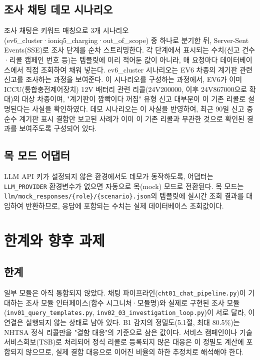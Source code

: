 \documentclass[11pt]{article}
\begin{document}
\subsection{조사 채팅 데모 시나리오}

조사 채팅은 키워드 매칭으로 3개 시나리오(ev6\_cluster·ioniq5\_charging·out\_of\_scope) 중 하나로 분기한 뒤, Server-Sent Events(SSE)로 조사 단계를 순차 스트리밍한다. 각 단계에서 표시되는 수치(신고 건수·리콜 캠페인 번호 등)는 템플릿에 미리 적어둔 값이 아니라, 매 요청마다 데이터베이스에서 직접 조회하여 채워 넣는다.
ev6\_cluster 시나리오는 EV6 차종의 계기판 관련 신고를 조사하는 과정을 보여준다. 이 시나리오를 구성하는 과정에서, EV6가 이미 ICCU(통합충전제어장치) 12V 배터리 관련 리콜(24V200000, 이후 24V867000으로 확대)의 대상 차종이며, "계기판이 깜빡이다 꺼짐" 유형 신고 대부분이 이 기존 리콜로 설명된다는 사실을 확인하였다. 데모 시나리오는 이 사실을 반영하여, 최근 90일 신고 중 순수 계기판 표시 결함만 보고된 사례가 이미 이 기존 리콜과 무관한 것으로 확인된 결과를 보여주도록 구성되어 있다.

\subsection{목 모드 어댑터}

LLM API 키가 설정되지 않은 환경에서도 데모가 동작하도록, 어댑터는 \texttt{LLM\_PROVIDER} 환경변수가 없으면 자동으로 목(mock) 모드로 전환된다. 목 모드는 \texttt{llm/mock\_responses/\{role\}/\{scenario\}.json}의 템플릿에 실시간 조회 결과를 대입하여 반환하므로, 응답에 포함되는 수치는 실제 데이터베이스 조회값이다.

\section{한계와 향후 과제}

\subsection{한계}

일부 모듈은 아직 통합되지 않았다. 채팅 파이프라인(\texttt{cht01\_chat\_pipeline.py})이 기대하는 조사 모듈 인터페이스(함수 시그니처·모듈명)와 실제로 구현된 조사 모듈(\texttt{inv01\_query\_templates.py}, \texttt{inv02\_03\_investigation\_loop.py})이 서로 달라, 이 연결은 실행되지 않는 상태로 남아 있다.
B1 감지의 정밀도(5.1절, 최대 80.5\%)는 NHTSA 정식 리콜만을 "결함 대응"의 기준으로 삼은 값이다. 서비스 캠페인이나 기술서비스회보(TSB)로 처리되어 정식 리콜로 등록되지 않은 대응은 이 정밀도 계산에 포함되지 않으므로, 실제 결함 대응으로 이어진 비율의 하한 추정치로 해석해야 한다.
\end{document}

